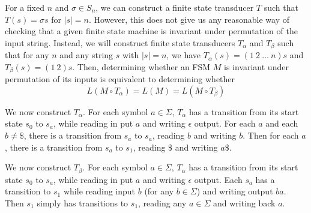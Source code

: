 \documentclass{llncs}
\begin{document}
For a fixed $n$ and $\sigma \in S_n$,
we can construct a finite state transducer
$T$ such that $T(s) = \sigma s$ for $|s|=n$.
However, this does not give us any
reasonable way of checking that a given
finite state machine is invariant under permutation
of the input string.
Instead, we will construct finite state
transducers $T_{\alpha}$ and $T_{\beta}$
such that for any $n$ and any string $s$
with $|s|=n$, we have
$T_{\alpha}(s)=(1\ 2\ \ldots\ n) s$ and
$T_{\beta}(s) = (1\ 2) s$.
Then, determining whether an FSM $M$ is
invariant under permutation of its inputs
is equivalent to determining whether
\[
  L(M \circ T_\alpha) = L(M) = L(M \circ T_\beta)
\]

We now construct $T_\alpha$.
For each symbol $a \in \Sigma$,
$T_\alpha$ has a transition from its start
state $s_0$ to $s_a$, while reading in put $a$ and
writing $\epsilon$ output.
For each $a$ and each $b\ne \$$, there is a
transition from $s_a$ to $s_a$, reading $b$
and writing $b$.
Then for each $a$, there is a transition from
$s_a$ to $s_1$, reading $\$$ and writing $a\$$.

We now construct $T_\beta$.
For each symbol $a \in \Sigma$,
$T_\alpha$ has a transition from its start
state $s_0$ to $s_a$, while reading in put $a$ and
writing $\epsilon$ output.
Each $s_a$ has a transition to $s_1$ while
reading input $b$ (for any $b\in \Sigma$)
and writing output $ba$.
Then $s_1$ simply has transitions to $s_1$,
reading any $a\in \Sigma$ and writing
back $a$.

\iffalse %
\subsection{Programs}
The previous section indicates a method for verifying
robustness of more general programs under permutation of inputs.
Given a procedure $F$ taking an array as argument, consider the functions $F_\alpha$, which first swaps the first two elements of the array, then computes $F$, and $F_\beta$, which moves the first element of the array to the back, then computes $F$. Then $F$ is invariant under permutation of its input if and only if $F$ is functionally equivalent to $F_\alpha$ and $F_\beta$.

Certainly this method is more efficient than checking invariance under a larger class of permutations. For DFAs, this simplification made the problem of permutation invariance solvable. This indicates that this simplification may aid in our analysis in a profound way. For example, this may be a much easier way of verifying this invariance compared to expressing permutations as a general $2$-safety property.
\fi
\end{document}
